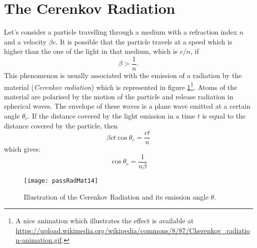 
\section{The Cerenkov Radiation}
Let's consider a particle travelling through a medium with a
refraction index $n$ and a velocity $\beta c$. It is possible that the
particle travels at a speed which is higher than the one of the light
in that medium, which is $c/n$, if
\[\beta > \frac{1}{n}.\]
This phenomenon is usually associated with the emission of a radiation
by the material (\emph{Cerenkov radiation}) which is represented in
figure \ref{fig:passRadMat14}\footnote{A nice animation which illustrates the effect is available at  \url{https://upload.wikimedia.org/wikipedia/commons/8/87/Cherenkov_radiation-animation.gif}.}. Atoms of the material are polarised by
the motion of the particle and release radiation in spherical
waves. The envelope of these waves is a plane wave emitted at a
certain angle $\theta_c$. If the distance covered by the light
emission in a time $t$ is equal to the distance covered by the
particle, then
\[\beta c t \cos\theta_c = \frac{ct}{n}\]
which gives:
\[\cos\theta_c = \frac{1}{n\beta}\]

\begin{figure}
  \centering \texttt{[image: passRadMat14]}
  \caption{Illustration of the Cerenkov Radiation and its emission angle $\theta$.}
  \label{fig:passRadMat14}
\end{figure}

